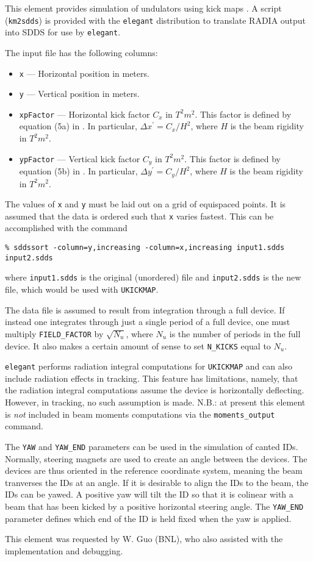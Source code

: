 This element provides simulation of undulators using kick maps \cite{Elleaume1992}.
A script (\verb|km2sdds|) is provided with the {\tt elegant}
distribution to translate RADIA \cite{radia} output into SDDS for use by
\verb|elegant|.

The input file has the following columns:
\begin{itemize}
\item \verb|x| --- Horizontal position in meters.
\item \verb|y| --- Vertical position in meters.
\item \verb|xpFactor| --- Horizontal kick factor $C_x$ in $T^2 m^2$.  This factor is defined by
equation (5a) in \cite{Elleaume1992}.  In particular, $\Delta x^\prime = C_x/H^2$, where
$H$ is the beam rigidity in  $T^2 m^2$.
\item \verb|ypFactor| --- Vertical kick factor $C_y$ in $T^2 m^2$. This factor is defined by
equation (5b) in \cite{Elleaume1992}.  In particular, $\Delta y^\prime = C_y/H^2$, where
$H$ is the beam rigidity in  $T^2 m^2$.
\end{itemize}
The values of \verb|x| and \verb|y| must be laid out on a grid of equispaced points.
It is assumed that the data is ordered such that \verb|x| varies fastest.  This can be
accomplished with the command
\begin{verbatim}
% sddssort -column=y,increasing -column=x,increasing input1.sdds input2.sdds
\end{verbatim}
where \verb|input1.sdds| is the original (unordered) file and \verb|input2.sdds| is the
new file, which would be used with \verb|UKICKMAP|.

The data file is assumed to result from integration through a full device. If instead one
integrates through just a single period of a full device, one must multiply \verb|FIELD_FACTOR|
by $\sqrt{N_u}$, where $N_u$ is the number of periods in the full device.  It also makes
a certain amount of sense to set \verb|N_KICKS| equal to $N_u$.

{\tt elegant} performs radiation integral computations
for \verb|UKICKMAP| and can also include radiation effects in
tracking.  This feature has limitations, namely, that the radiation
integral computations assume the device is horizontally deflecting.
However, in tracking, no such assumption is made.  N.B.: at present
this element is {\em not} included in beam moments
computations via the \verb|moments_output| command.

The \verb|YAW| and \verb|YAW_END| parameters can be used in the simulation of canted IDs.
Normally, steering magnets are used to create an angle between the devices.
The devices are thus oriented in the reference coordinate system, meaning the beam tranverses
the IDs at an angle.
If it is desirable to align the IDs to the beam, the IDs can be yawed. A positive yaw will
tilt the ID so that it is colinear with a beam that has been kicked by a positive horizontal
steering angle.
The \verb|YAW_END| parameter defines which end of the ID is held fixed when the yaw is applied.

This element was requested by W. Guo (BNL), who also assisted with the
implementation and debugging.

